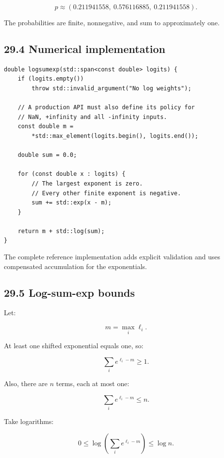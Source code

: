 \[ \boxed{ p\approx (0.211941558,\ 0.576116885,\ 0.211941558) }. \]

The probabilities are finite, nonnegative, and sum to approximately one.

\subsection{29.4 Numerical implementation}\label{02-foundations-ii-ch031-numerical-implementation}

\hypertarget{02-foundations-ii-ch031-numerical-implementation}{}

\begin{verbatim}
double logsumexp(std::span<const double> logits) {
    if (logits.empty())
        throw std::invalid_argument("No log weights");

    // A production API must also define its policy for
    // NaN, +infinity and all -infinity inputs.
    const double m =
        *std::max_element(logits.begin(), logits.end());

    double sum = 0.0;

    for (const double x : logits) {
        // The largest exponent is zero.
        // Every other finite exponent is negative.
        sum += std::exp(x - m);
    }

    return m + std::log(sum);
}
\end{verbatim}

The complete reference implementation adds explicit validation and uses compensated accumulation for the exponentials.

\subsection{29.5 Log-sum-exp bounds}\label{02-foundations-ii-ch031-log-sum-exp-bounds}

\hypertarget{02-foundations-ii-ch031-log-sum-exp-bounds}{}

Let:

\[ m=\max_i\ell_i. \]

At least one shifted exponential equals one, so:

\[ \sum_ie^{\ell_i-m}\ge1. \]

Also, there are \(n\) terms, each at most one:

\[ \sum_ie^{\ell_i-m}\le n. \]

Take logarithms:

\[ 0\le \log\left(\sum_ie^{\ell_i-m}\right) \le\log n. \]


